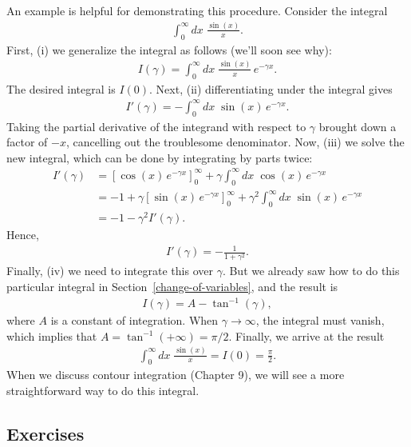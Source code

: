\documentclass[10pt,a4paper]{article}
\begin{document}
An example is helpful for demonstrating this procedure.  Consider the integral
\begin{align}
  \int_{0}^\infty dx \; \frac{\sin(x)}{x}.
\end{align}
First, (i) we generalize the integral as follows (we'll soon see why):
\begin{align}
  I(\gamma) = \int_{0}^\infty dx \; \frac{\sin(x)}{x}\, e^{-\gamma x}.
\end{align}
The desired integral is $I(0)$.  Next, (ii) differentiating under the
integral gives
\begin{align}
  I'(\gamma) = - \int_{0}^\infty dx \; \sin(x)\, e^{-\gamma x}.
\end{align}
Taking the partial derivative of the integrand with respect to
$\gamma$ brought down a factor of $-x$, cancelling out the troublesome
denominator.  Now, (iii) we solve the new integral, which can be done
by integrating by parts twice:
\begin{align}
  I'(\gamma) &= \left[\cos(x)\,e^{-\gamma x}\right]_0^\infty + \gamma \int_{0}^\infty dx \; \cos(x)\, e^{-\gamma x} \\
  &= -1 + \gamma \left[\sin(x)\,e^{-\gamma x}\right]_0^\infty + \gamma^2 \int_{0}^\infty dx \; \sin(x)\, e^{-\gamma x} \\
  &= -1 - \gamma^2 I'(\gamma).
\end{align}
Hence,
\begin{align}
  I'(\gamma) = - \frac{1}{1+\gamma^2}.
\end{align}
Finally, (iv) we need to integrate this over $\gamma$. But we already
saw how to do this particular integral in
Section~\ref{change-of-variables}, and the result is
\begin{align}
  I(\gamma) = A - \tan^{-1}(\gamma),
\end{align}
where $A$ is a constant of integration. When $\gamma \rightarrow
\infty$, the integral must vanish, which implies that $A =
\tan^{-1}(+\infty) = \pi/2$.  Finally, we arrive at the result
\begin{align}
  \int_{0}^\infty dx \; \frac{\sin(x)}{x} = I(0) = \frac{\pi}{2}.
\end{align}
When we discuss contour integration (Chapter 9), we will see a more
straightforward way to do this integral.

\subsection{Exercises}
\label{exercises}
\end{document}
